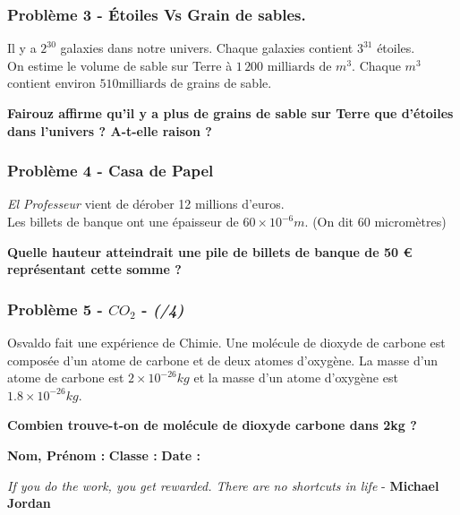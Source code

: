 \Pointilles[4]

\subsubsection*{Problème 3 - Étoiles Vs Grain de sables.}

Il y a $2^{30}$ galaxies dans notre univers. Chaque galaxies contient $3^{31}$ étoiles.  \\
On estime le volume de sable sur Terre à $1\,200 \text{ milliards de } m^3$. Chaque $m^3$ contient environ $510 \text{milliards}$ de grains de sable. 

\textbf{Fairouz affirme qu'il y a plus de grains de sable sur Terre que d'étoiles dans l'univers ? A-t-elle raison ?}

\Pointilles[4]

\subsubsection*{Problème 4 - Casa de Papel}

\textit{\og El Professeur \fg{} } vient de dérober 12 millions d’euros. \\
Les billets de banque ont une épaisseur de $60 \times 10^{-6} m$. (On dit 60 micromètres)

\textbf{Quelle hauteur atteindrait une pile de billets de banque de 50 \euro{} représentant cette somme ?}

\Pointilles[5]

\subsubsection*{Problème 5 - $CO_2$  - \textit{(/4)}}

Osvaldo fait une expérience de Chimie. Une molécule de dioxyde de carbone est composée d'un atome de carbone et de deux atomes d'oxygène. La masse d'un atome de carbone est $2 \times 10^{-26}kg$ et la masse d'un atome d'oxygène est $1.8 \times 10^{-26}kg$. 

\textbf{Combien trouve-t-on de molécule de dioxyde carbone dans 2kg ?}

\Pointilles[5]

\newpage


\textbf{Nom, Prénom :} \hspace{8cm} \textbf{Classe :} \hspace{3cm} \textbf{Date :}\\

\begin{center}
  \textit{If you do the work, you get rewarded. There are no shortcuts in life}  - \textbf{Michael Jordan}
\end{center}

